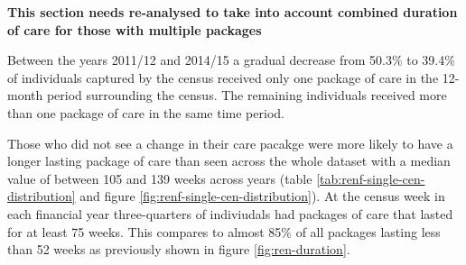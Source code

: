 \documentclass[]{article}
\begin{document}
\textbf{This section needs re-analysed to take into account combined
duration of care for those with multiple packages}

Between the years 2011/12 and 2014/15 a gradual decrease from 50.3\% to
39.4\% of individuals captured by the census received only one package
of care in the 12-month period surrounding the census. The remaining
individuals received more than one package of care in the same time
period.

Those who did not see a change in their care pacakge were more likely to
have a longer lasting package of care than seen across the whole dataset
with a median value of between 105 and 139 weeks across years (table
\ref{tab:renf-single-cen-distribution} and figure
\ref{fig:renf-single-cen-distribution}). At the census week in each
financial year three-quarters of indiviudals had packages of care that
lasted for at least 75 weeks. This compares to almost 85\% of all
packages lasting less than 52 weeks as previously shown in figure
\ref{fig:ren-duration}.

\begin{table}[h]
\centering
\caption{Summary statistics of package duration (weeks) for individuals receiving a single package of home care in 12 months surrounding the census week}
\label{tab:renf-single-cen-distribution}
\end{table}
\end{document}
